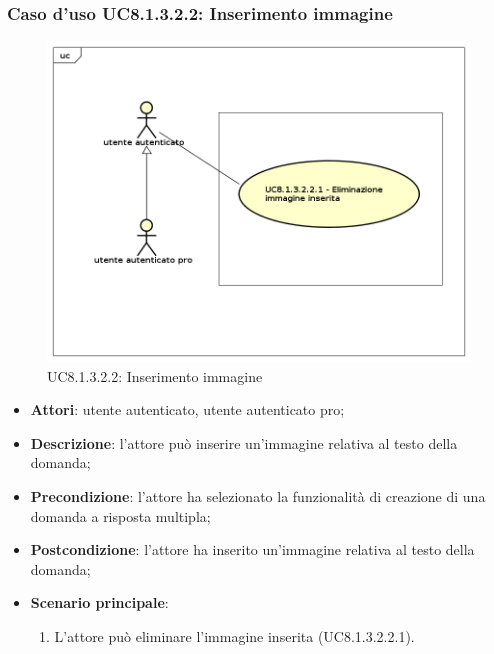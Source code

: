 \subsubsection{Caso d'uso UC8.1.3.2.2: Inserimento immagine}
	\label{UC8.1.3.2.2}
	\begin{figure}[h]
		\centering
			\includegraphics[scale=0.45,keepaspectratio]{UML/UC8_1_3_2_2.png}
		\caption{UC8.1.3.2.2: Inserimento immagine}
	\end{figure}
	\FloatBarrier
	\begin{itemize}
		\item
			\textbf{Attori}: utente autenticato, utente autenticato pro;
		\item		
			\textbf{Descrizione}: l'attore può inserire un'immagine relativa al testo della domanda;
		\item
			\textbf{Precondizione}: l'attore ha selezionato la funzionalità di creazione di una domanda a risposta multipla; 
		\item
			\textbf{Postcondizione}: l'attore ha inserito un'immagine relativa al testo della domanda;
		\item
			\textbf{Scenario principale}: 
			\begin{enumerate}
				\item
					L'attore può eliminare l'immagine inserita (UC8.1.3.2.2.1).	
			\end{enumerate}						
	\end{itemize}

